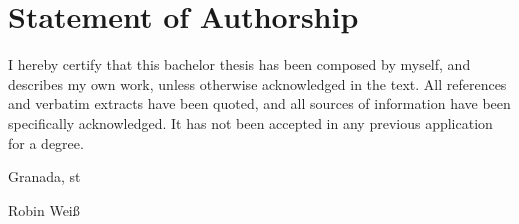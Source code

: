 \thispagestyle{empty}

\section*{Statement of Authorship}
I hereby certify that this bachelor thesis has been composed by myself, and describes my own work, unless otherwise acknowledged in the text. All references and verbatim extracts have been quoted, and all sources of information have been specifically acknowledged. It has not been accepted in any previous application for a degree.

\vspace{1cm}

\noindent 
Granada, \the\day st \monthname \: \the\year

\vspace{2cm}

\noindent
Robin Weiß
